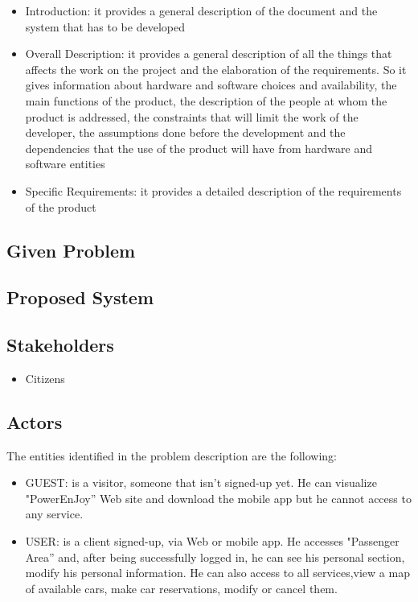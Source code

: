 \documentclass[english]{article}
\newcounter{requirement}
\begin{document}
\begin{itemize}
	\item Introduction: it provides a general description of the document and the system that has to be developed
	\item Overall Description: it provides a general description of all the things that  affects the work on the project and the elaboration of the requirements. So it gives information about hardware and software choices and availability, the main functions of the product, the description of the people at whom the product is addressed, the constraints that will limit the work of the developer, the assumptions done before the development and the dependencies that the use of the product will have from hardware and software entities
	\item Specific Requirements: it provides a detailed description of the requirements of the product
\end{itemize}


\subsection{Given Problem}

\subsection{Proposed System}


\subsection{Stakeholders}
\begin{itemize}
	\item Citizens
	
	
\end{itemize}



\subsection{Actors}
The entities identified in the problem description are the following: 
\begin{itemize}
	\item GUEST: is a visitor, someone that isn't signed-up yet. He can visualize
	"PowerEnJoy'' Web site and download the mobile app but he cannot
	access to any service.
	\item USER: is a client signed-up, via Web or mobile app. He accesses
	"Passenger Area'' and, after being successfully logged in, he can see
	his personal section, modify his personal information. He can also
	access to all services,view a map of available cars, make car reservations, modify or
	cancel them.
\end{itemize}
\end{document}
